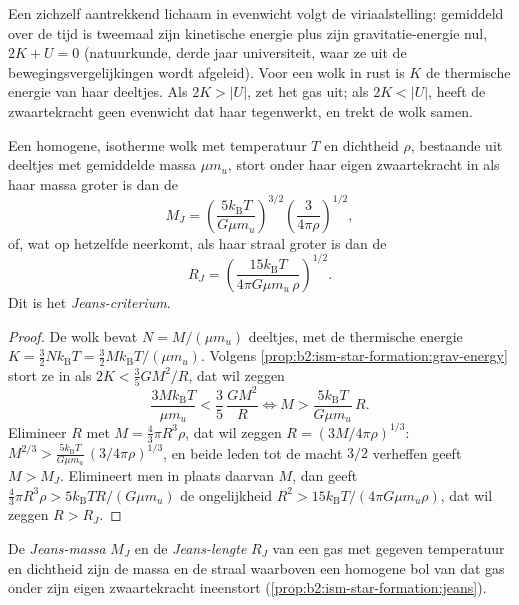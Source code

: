 Een zichzelf aantrekkend lichaam in evenwicht volgt de viriaalstelling: gemiddeld
over de tijd is tweemaal zijn kinetische energie plus zijn gravitatie-energie nul,
$2K + U = 0$ (natuurkunde, derde jaar universiteit, waar ze uit de
bewegingsvergelijkingen wordt afgeleid). Voor een wolk in rust is $K$ de thermische energie van haar
deeltjes. Als $2K > |U|$, zet het gas uit; als $2K < |U|$, heeft de zwaartekracht geen
evenwicht dat haar tegenwerkt, en trekt de wolk samen.

\begin{proposition}\label{prop:b2:ism-star-formation:jeans}
Een homogene, isotherme wolk met temperatuur $T$ en dichtheid $\rho$, bestaande uit
deeltjes met gemiddelde massa $\mu m_u$, stort onder haar eigen zwaartekracht in als haar massa
groter is dan de \emph{}
\[
  M_J = \left(\frac{5 k_{\mathrm B} T}{G\mu m_u}\right)^{3/2}
        \left(\frac{3}{4\pi\rho}\right)^{1/2},
\]
of, wat op hetzelfde neerkomt, als haar straal groter is dan de \emph{}
\[
  R_J = \left(\frac{15 k_{\mathrm B} T}{4\pi G\mu m_u\,\rho}\right)^{1/2}.
\]
Dit is het \emph{Jeans-criterium}.
\end{proposition}

\begin{proof}
De wolk bevat $N = M/(\mu m_u)$ deeltjes, met de thermische energie
$K = \tfrac32 N k_{\mathrm B}T = \tfrac32 M k_{\mathrm B}T/(\mu m_u)$. Volgens
\cref{prop:b2:ism-star-formation:grav-energy} stort ze in als
$2K < \tfrac35 GM^2/R$, dat wil zeggen
\[
  \frac{3 M k_{\mathrm B} T}{\mu m_u} < \frac{3}{5}\,\frac{G M^2}{R}
  \iff M > \frac{5 k_{\mathrm B} T}{G \mu m_u}\, R .
\]
Elimineer $R$ met $M = \tfrac43\pi R^3\rho$, dat wil zeggen $R = (3M/4\pi\rho)^{1/3}$:
$M^{2/3} > \frac{5 k_{\mathrm B}T}{G\mu m_u}\,(3/4\pi\rho)^{1/3}$, en beide leden
tot de macht $3/2$ verheffen geeft $M > M_J$. Elimineert men in plaats daarvan $M$, dan geeft
$\tfrac43\pi R^3\rho > 5 k_{\mathrm B}T R/(G\mu m_u)$ de ongelijkheid $R^2 > 15
k_{\mathrm B}T/(4\pi G\mu m_u\rho)$, dat wil zeggen $R > R_J$.
\end{proof}

\begin{definition}\label{def:b2:ism-star-formation:jeans}
De \emph{Jeans-massa} $M_J$ en de \emph{Jeans-lengte} $R_J$ van een gas met gegeven temperatuur en dichtheid
zijn de massa en de straal waarboven een homogene bol van dat gas
onder zijn eigen zwaartekracht ineenstort
(\cref{prop:b2:ism-star-formation:jeans}).
\end{definition}

